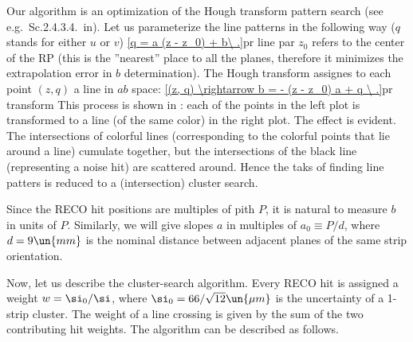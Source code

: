 Our algorithm is an optimization of the Hough transform pattern search (see e.g.~Sc.2.4.3.4.~in). Let us parameterize the line patterns in the following way ($q$ stands for either $u$ or $v$)
\eqref{q = a (z - z_0) + b\ .}{pr line par}
$z_0$ refers to the center of the RP (this is the ''nearest'' place to all the planes, therefore it minimizes the extrapolation error in $b$ determination). The Hough transform assignes to each point $(z, q)$ a line in $ab$ space:
\eqref{(z, q) \rightarrow b = - (z - z_0) a + q \ .}{pr transform}
This process is shown in : each of the points in the left plot is transformed to a line (of the same color) in the right plot. The effect is evident. The intersections of colorful lines (corresponding to the colorful points that lie around a line) cumulate together, but the intersections of the black line (representing a noise hit) are scattered around. Hence the taks of finding line patters is reduced to a (intersection) cluster search.

Since the RECO hit positions are multiples of pith $P$, it is natural to measure $b$ in units of $P$. Similarly, we will give slopes $a$ in multiples of $a_0 \equiv P / d$, where $d = 9 \un{mm}$ is the nominal distance between adjacent planes of the same strip orientation.


Now, let us describe the cluster-search algorithm. Every RECO hit is assigned a weight $w = \si_0/\si$, where $\si_0 = 66/\sqrt{12} \un{\mu m}$ is the uncertainty of a 1-strip cluster. The weight of a line crossing is given by the sum of the two contributing hit weights. The algorithm can be described as follows.

